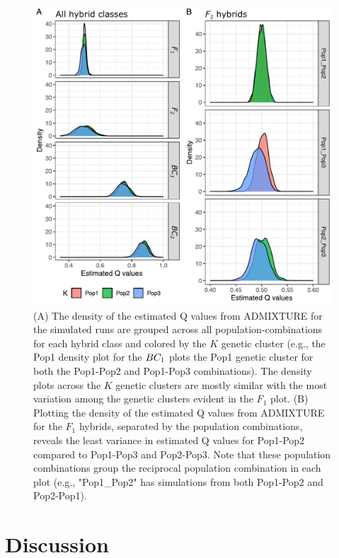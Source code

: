 {%
\begin{figure}
\newcommand{\pigsimsqscap}{\footnotesize (A) The density of the estimated Q values from ADMIXTURE for
the simulated runs are
grouped across all population-combinations for each hybrid class and colored by the $K$ genetic cluster
(e.g., the Pop1 density plot for the $\BC_1$ plots the Pop1 genetic cluster for both
the Pop1-Pop2 and Pop1-Pop3 combinations). The density plots across the $K$
genetic clusters are mostly similar with the most variation among the genetic clusters evident in
the $F_1$ plot. (B) Plotting the density of the estimated Q values from ADMIXTURE for the $F_1$ hybrids,
separated by the population combinations, reveals the least variance in estimated Q values for
Pop1-Pop2 compared to Pop1-Pop3 and Pop2-Pop3. Note that these population combinations group the
reciprocal population combination in each plot (e.g., "Pop1\_Pop2" has simulations
from both Pop1-Pop2 and Pop2-Pop1).}
\includegraphics[width=\columnwidth]{figures/simulation-density-multipanel.pdf}
\caption[\pigsimsqscap]{\pigsimsqscap}
\label{fig:pig-sim-qs}
\end{figure}

\section*{Discussion}

}

